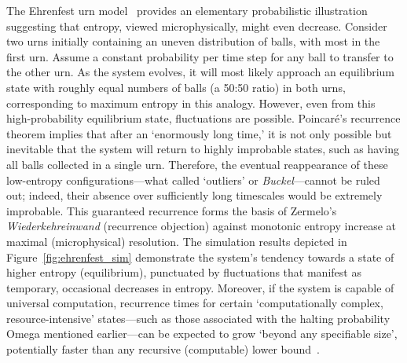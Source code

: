 \documentclass[shortAfour,sageh,times]{sagej}
\begin{document}
The Ehrenfest urn model~\citep{Ehrenfest_06g} provides an elementary probabilistic illustration suggesting that entropy, viewed microphysically, might even decrease.
Consider two urns initially containing an uneven distribution of balls, with most in the first urn.
Assume a constant probability per time step for any ball to transfer to the other urn.
As the system evolves, it will most likely approach an equilibrium state with roughly equal numbers of balls (a 50:50 ratio) in both urns, corresponding to maximum entropy in this analogy.
However, even from this high-probability equilibrium state, fluctuations are possible.
Poincar\'e's recurrence theorem implies that after an `enormously long time,' it is not only possible but inevitable that the system will return to highly improbable states, such as having all balls collected in a single urn.
Therefore, the eventual reappearance of these low-entropy configurations---what \cite{Ehrenfest_06g} called `outliers' or \textit{Buckel}---cannot be ruled out; indeed, their absence over sufficiently long timescales would be extremely improbable.
This guaranteed recurrence forms the basis of Zermelo's \textit{Wiederkehreinwand} (recurrence objection) against monotonic entropy increase at maximal (microphysical) resolution.
The simulation results depicted in Figure~\ref{fig:ehrenfest_sim} demonstrate the system's tendency towards a state of higher entropy (equilibrium), punctuated by fluctuations that manifest as temporary, occasional decreases in entropy.
Moreover, if the system is capable of universal computation,
recurrence times for certain `computationally complex, resource-intensive' states---such as those associated with the halting probability Omega mentioned earlier---can be expected to grow `beyond any specifiable size',
potentially faster than any recursive (computable) lower bound~\citep{svozil-93}.
\end{document}
